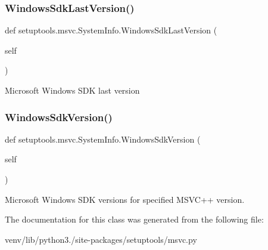 \subsubsection{\texorpdfstring{Windows\+Sdk\+Last\+Version()}{WindowsSdkLastVersion()}}
{\footnotesize\ttfamily def setuptools.\+msvc.\+System\+Info.\+Windows\+Sdk\+Last\+Version (\begin{DoxyParamCaption}\item[{}]{self }\end{DoxyParamCaption})}

\begin{DoxyVerb}Microsoft Windows SDK last version
\end{DoxyVerb}
 \mbox{\label{classsetuptools_1_1msvc_1_1_system_info_ae7566034b3ec2e80c3bf9d6d9289dc1b}} 
\subsubsection{\texorpdfstring{Windows\+Sdk\+Version()}{WindowsSdkVersion()}}
{\footnotesize\ttfamily def setuptools.\+msvc.\+System\+Info.\+Windows\+Sdk\+Version (\begin{DoxyParamCaption}\item[{}]{self }\end{DoxyParamCaption})}

\begin{DoxyVerb}Microsoft Windows SDK versions for specified MSVC++ version.
\end{DoxyVerb}
 

The documentation for this class was generated from the following file\+:\begin{DoxyCompactItemize}
\item 
venv/lib/python3./site-\/packages/setuptools/msvc.\+py\end{DoxyCompactItemize}
